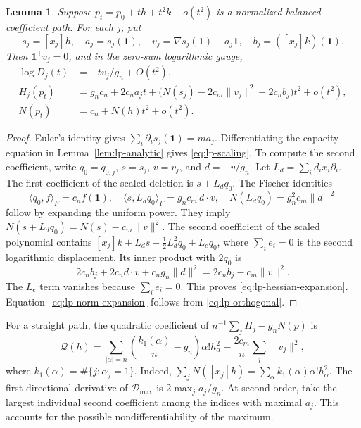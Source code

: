 \documentclass[11pt,a4paper]{article}
\newtheorem{lemma}[theorem]{Lemma}
\theoremstyle{definition}
\theoremstyle{remark}
\newcommand{\T}{\mathsf{T}}
\begin{document}
\begin{lemma}\label{lem:lp-variation}
Suppose $p_t=p_0+th+t^2k+o(t^2)$ is a normalized balanced coefficient path.
For each $j$, put
\[
 s_j=[x_j]h,\quad a_j=s_j(\mathbf1),\quad
 v_j=\nabla s_j(\mathbf1)-a_j\mathbf1,\quad
 b_j=([x_j]k)(\mathbf1).
\]
Then $\mathbf1^\T v_j=0$, and in the zero-sum logarithmic gauge,
\begin{align}
 \log D_j(t)&=-t v_j/g_n+O(t^2),\label{eq:lp-scaling}\\
 H_j(p_t)&=g_nc_n+2c_na_jt+
 \bigl(N(s_j)-2c_m\|v_j\|^2+2c_nb_j\bigr)t^2+o(t^2),\label{eq:lp-hessian-expansion}\\
 N(p_t)&=c_n+N(h)t^2+o(t^2).\label{eq:lp-norm-expansion}
\end{align}
\end{lemma}
\begin{proof}
Euler's identity gives $\sum_i\partial_i s_j(\mathbf1)=ma_j$.
Differentiating the capacity equation in Lemma~\ref{lem:lp-analytic} gives \eqref{eq:lp-scaling}.
To compute the second coefficient, write $q_0=q_{0,j}$, $s=s_j$, $v=v_j$, and $d=-v/g_n$.
Let $L_d=\sum_i d_i x_i\partial_i$.
The first coefficient of the scaled deletion is $s+L_dq_0$.
The Fischer identities
\[
 \langle q_0,f\rangle_F=c_nf(\mathbf1),\quad
 \langle s,L_dq_0\rangle_F=g_nc_m\,d\cdot v,\quad
 N(L_dq_0)=g_n^2c_m\|d\|^2
\]
follow by expanding the uniform power.
They imply $N(s+L_dq_0)=N(s)-c_m\|v\|^2$.
The second coefficient of the scaled polynomial contains
$[x_j]k+L_ds+\tfrac12L_d^2q_0+L_eq_0$, where $\sum_i e_i=0$ is the second logarithmic displacement.
Its inner product with $2q_0$ is
\[
 2c_nb_j+2c_n d\cdot v+c_ng_n\|d\|^2
 =2c_nb_j-c_m\|v\|^2.
\]
The $L_e$ term vanishes because $\sum_i e_i=0$.
This proves \eqref{eq:lp-hessian-expansion}.
Equation~\eqref{eq:lp-norm-expansion} follows from \eqref{eq:lp-orthogonal}.
\end{proof}

For a straight path, the quadratic coefficient of $n^{-1}\sum_jH_j-g_nN(p)$ is
\begin{equation}\label{eq:lp-general-quadratic}
 \mathcal Q(h)=\sum_{|\alpha|=n}
 \left(\frac{k_1(\alpha)}n-g_n\right)\alpha!h_\alpha^2
 -\frac{2c_m}{n}\sum_j\|v_j\|^2,
\end{equation}
where $k_1(\alpha)=\#\{j:\alpha_j=1\}$.
Indeed, $\sum_jN([x_j]h)=\sum_\alpha k_1(\alpha)\alpha!h_\alpha^2$.
The first directional derivative of $\mathcal D_{\max}$ is $2\max_j a_j/g_n$.
At second order, take the largest individual second coefficient among the indices with maximal $a_j$.
This accounts for the possible nondifferentiability of the maximum.
\end{document}
